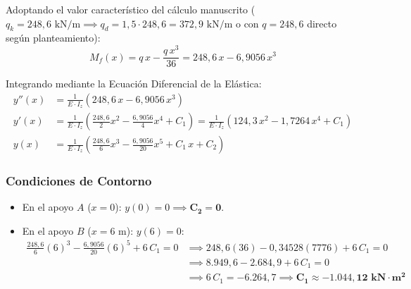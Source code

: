 
Adoptando el valor característico del cálculo manuscrito ($q_k = 248{,}6\text{ kN/m} \implies q_d = 1{,}5 \cdot 248{,}6 = 372{,}9\text{ kN/m}$ o con $q = 248{,}6$ directo según planteamiento):
\begin{equation}
    M_f(x) = q\,x - \frac{q\,x^3}{36} = 248{,}6\,x - 6{,}9056\,x^3
\end{equation}

Integrando mediante la Ecuación Diferencial de la Elástica:
\begin{align}
    y''(x) & = \frac{1}{E \cdot I_z} \left( 248{,}6\,x - 6{,}9056\,x^3 \right) \\[6pt]
    y'(x)  & = \frac{1}{E \cdot I_z} \left( \frac{248{,}6}{2}x^2 - \frac{6{,}9056}{4}x^4 + C_1 \right) = \frac{1}{E \cdot I_z} \left( 124{,}3\,x^2 - 1{,}7264\,x^4 + C_1 \right) \\[6pt]
    y(x)   & = \frac{1}{E \cdot I_z} \left( \frac{248{,}6}{6}x^3 - \frac{6{,}9056}{20}x^5 + C_1\,x + C_2 \right)
\end{align}

\subsubsection*{Condiciones de Contorno}
\begin{itemize}
    \item En el apoyo $A$ ($x = 0$): $y(0) = 0 \implies \mathbf{C_2 = 0}$.
    \item En el apoyo $B$ ($x = 6\text{ m}$): $y(6) = 0$:
          \begin{align}
              \frac{248{,}6}{6}(6)^3 - \frac{6{,}9056}{20}(6)^5 + 6\,C_1 = 0 & \implies 248{,}6(36) - 0{,}34528(7776) + 6\,C_1 = 0 \nonumber \\
              & \implies 8.949{,}6 - 2.684{,}9 + 6\,C_1 = 0 \nonumber \\
              & \implies 6\,C_1 = -6.264{,}7 \implies \mathbf{C_1 \approx -1.044{,}12\text{ kN}\cdot\text{m}^2}
          \end{align}
\end{itemize}

